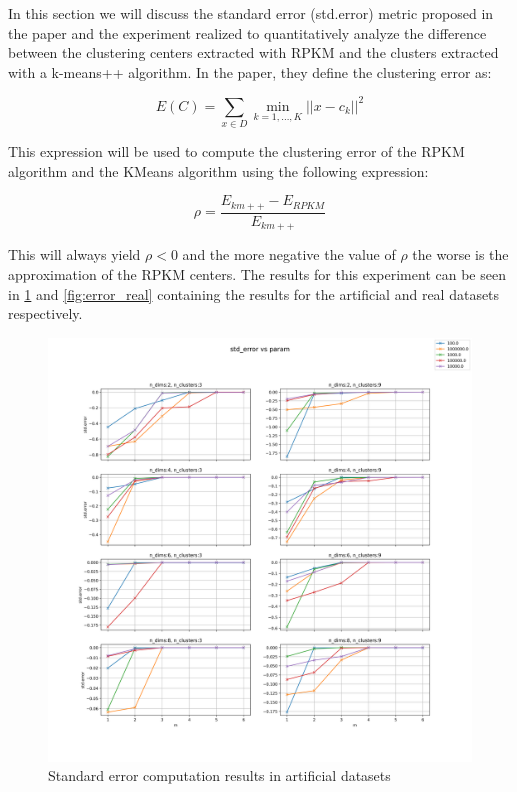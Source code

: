 In this section we will discuss the standard error (std.error) metric proposed in the paper and the experiment realized to quantitatively analyze the difference between the clustering centers extracted with RPKM and the clusters extracted with a k-means++ algorithm. In the paper, they define the clustering error as:

$$E(C) = \sum_{x \in D} \min_{k=1,\dots,K}||x-c_k||^2$$

This expression will be used to compute the clustering error of the RPKM algorithm and the KMeans algorithm using the following expression:

$$\rho = \frac{E_{km++} - E_{RPKM}}{E_{km++}}$$

This will always yield $\rho < 0$ and the more negative the value of $\rho$ the worse is the approximation of the RPKM centers. The results for this experiment can be seen in \ref{fig:error_art} and \ref{fig:error_real} containing the results for the artificial and real datasets respectively.

\begin{figure}[!ht]
    \includegraphics[width=\linewidth]{images/experiments/std_error_artificial.png}
    \caption{Standard error computation results in artificial datasets}
    \label{fig:error_art}
\end{figure}

